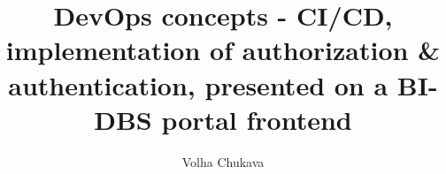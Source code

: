 \title{DevOps concepts - CI/CD, implementation of authorization \& authentication, presented on a BI-DBS portal frontend}
\author{Volha Chukava} 
